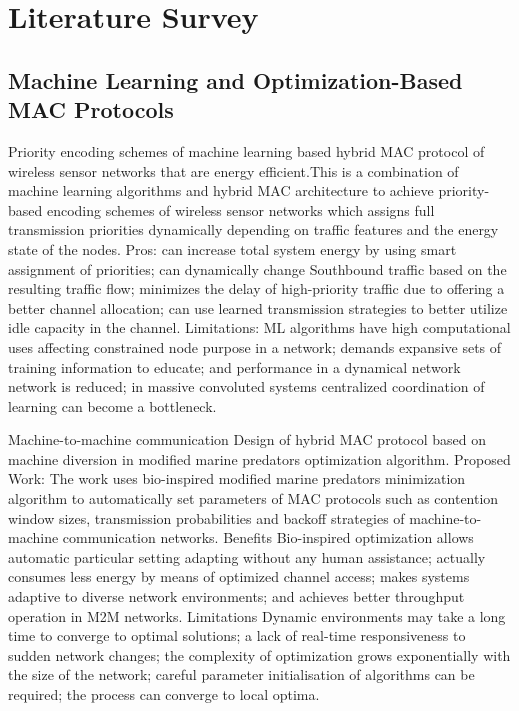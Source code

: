 \documentclass[a4paper,fleqn]{cas-dc}
\numberwithin{equation}{section}
\begin{document}
\section{Literature Survey}
\subsection{Machine Learning and Optimization-Based MAC Protocols}
Priority encoding schemes of machine learning based hybrid MAC protocol of wireless sensor networks that are energy efficient.This is a combination of machine learning algorithms and hybrid MAC architecture to achieve priority-based encoding schemes of wireless sensor networks which assigns full transmission priorities dynamically depending on traffic features and the energy state of the nodes. Pros: can increase total system energy by using smart assignment of priorities; can dynamically change Southbound traffic based on the resulting traffic flow; minimizes the delay of high-priority traffic due to offering a better channel allocation; can use learned transmission strategies to better utilize idle capacity in the channel. Limitations: ML algorithms have high computational uses affecting constrained node purpose in a network; demands expansive sets of training information to educate; and performance in a dynamical network network is reduced; in massive convoluted systems centralized coordination of learning can become a bottleneck.\cite{Albalawi2025}

Machine-to-machine communication Design of hybrid MAC protocol based on machine diversion in modified marine predators optimization algorithm.
Proposed Work: The work uses bio-inspired modified marine predators minimization algorithm to automatically set parameters of MAC protocols such as contention window sizes, transmission probabilities and backoff strategies of machine-to-machine communication networks. Benefits Bio-inspired optimization allows automatic particular setting adapting without any human assistance; actually consumes less energy by means of optimized channel access; makes systems adaptive to diverse network environments; and achieves better throughput operation in M2M networks. Limitations Dynamic environments may take a long time to converge to optimal solutions; a lack of real-time responsiveness to sudden network changes; the complexity of optimization grows exponentially with the size of the network; careful parameter initialisation of algorithms can be required; the process can converge to local optima.\cite{Sammaiah2025235}\cite{Poornima2025}
\end{document}
